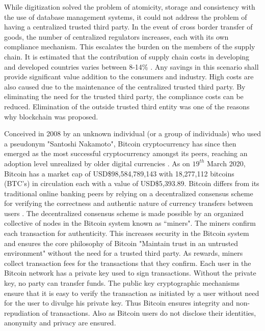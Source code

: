 \documentclass[num-refs]{wiley-article}
\begin{document}
While digitization solved the problem of atomicity, storage and consistency with the use of database management systems, it could not address the problem of having a centralized trusted third party. In the event of cross border transfer of goods, the number of centralized regulators increases, each with its own compliance mechanism. This escalates the burden on the members of the supply chain. It is estimated that the contribution of supply chain costs in developing and developed countries varies between 8-14\% \cite{li2020research}. Any savings in this scenario shall provide significant value addition to the consumers and industry. High costs are also caused due to the maintenance of the centralized trusted third party. By eliminating the need for the trusted third party, the compliance costs can be reduced. Elimination of the outside trusted third entity was one of the reasons why blockchain was proposed.

Conceived in 2008 by an unknown individual (or a group of individuals) who used a pseudonym "Santoshi Nakamoto", Bitcoin cryptocurrency has since then emerged as the most successful cryptocurrency amongst its peers, reaching an adoption level unrealized by older digital currencies \cite{park2019nodes, FENG201945, WANG201943}. As on $19^{th}$ March 2020, Bitcoin has a market cap of USD\$98,584,789,143 with 18,277,112 bitcoins (BTC's) in circulation each with a value of USD\$5,393.89. Bitcoin differs from its traditional online banking peers by relying on a decentralized consensus scheme for verifying the correctness and authentic nature of currency transfers between users \cite{rahouti2018bitcoin, nakamoto2019bitcoin, AGGARWAL201913}. The decentralized consensus scheme is made possible by an organized collective of nodes in the Bitcoin system known as ``miners". The miners confirm each transaction for authenticity. This increases security in the Bitcoin system and ensures the core philosophy of Bitcoin "Maintain trust in an untrusted environment" without the need for a trusted third party. As rewards, miners collect transaction fees for the transactions that they confirm. Each user in the Bitcoin network has a private key used to sign transactions. Without the private key, no party can transfer funds. The public key cryptographic mechanisms ensure that it is easy to verify the transaction as initiated by a user without need for the user to divulge his private key. Thus Bitcoin ensures integrity and non-repudiation of transactions. Also as Bitcoin users do not disclose their identities, anonymity and privacy are ensured.
\end{document}
